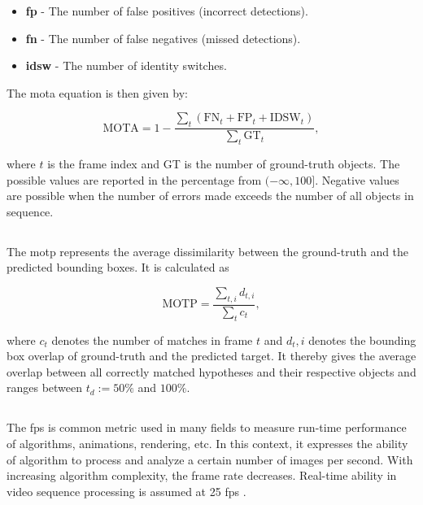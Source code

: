         \begin{itemize}
            \item \textbf{\Gls{fp}} - The number of false positives (incorrect detections).
            \item \textbf{\Gls{fn}} - The number of false negatives (missed detections).
            \item \textbf{\Gls{idsw}} - The number of identity switches.
        \end{itemize}

        The \gls{mota} equation is then given by:
        
        \begin{equation}
            \text{MOTA} = 1 - \frac{\sum_{t} \left( \text{FN}_t + \text{FP}_t + \text{IDSW}_t \right)}{\sum_{t}\text{GT}_t},
        \end{equation}
        
        where $t$ is the frame index and GT is the number of ground-truth objects. The possible values are reported in the percentage from $(-\infty, 100]$. Negative values are possible when the number of errors made exceeds the number of all objects in sequence.
    
    \subsection{} 
        The \gls{motp} represents the average dissimilarity between the ground-truth and the predicted bounding boxes. It is calculated as 
        
        \begin{equation}
            \text{MOTP} = \frac{\sum_{t,i} d_{t,i}}{\sum_{t}c_t},
        \end{equation}
        
        where $c_t$ denotes the number of matches in frame $t$ and $d_t,i$ denotes the bounding box overlap of ground-truth and the predicted target. It thereby gives the average overlap between all correctly matched hypotheses and their respective objects and ranges between $t_d := 50\%$ and $100\%$. \cite{MOTChallenge2015}
    
    \subsection{} 
        The \gls{fps} is common metric used in many fields to measure run-time performance of algorithms, animations, rendering, etc. In this context, it expresses the ability of algorithm to process and analyze a certain number of images per second. With increasing algorithm complexity, the frame rate decreases. Real-time ability in video sequence processing is assumed at 25 \gls{fps} \cite{MOTChallenge2015}.
        
